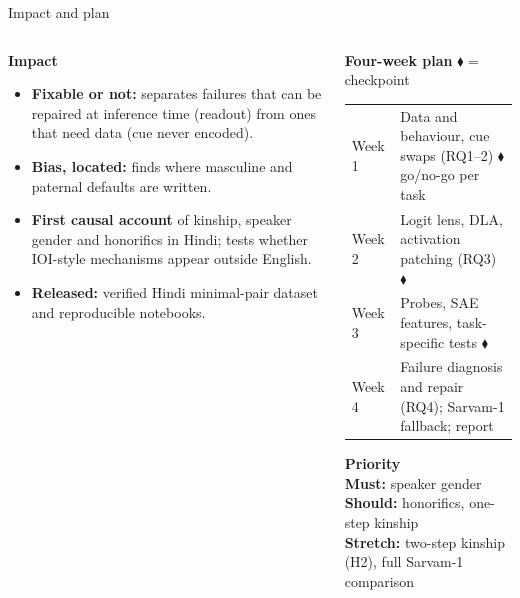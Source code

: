 \documentclass[aspectratio=169,10pt]{beamer}
\begin{document}
\begin{frame}{Impact and plan}
\begin{columns}[T]
\begin{column}{0.47\textwidth}
\small
\textbf{Impact}
\begin{itemize}
  \setlength\itemsep{0.3em}
  \item \textbf{Fixable or not:} separates failures that can be repaired at inference time (readout) from ones that need data (cue never encoded).
  \item \textbf{Bias, located:} finds where masculine and paternal defaults are written.
  \item \textbf{First causal account} of kinship, speaker gender and honorifics in Hindi; tests whether IOI-style mechanisms appear outside English.
  \item \textbf{Released:} verified Hindi minimal-pair dataset and reproducible notebooks.
\end{itemize}
\end{column}
\begin{column}{0.5\textwidth}
\footnotesize
\textbf{Four-week plan} \textcolor{accent}{\(\blacklozenge\)} = checkpoint
\vspace{0.2em}

\begin{tabularx}{\textwidth}{@{}l Y@{}}
\toprule
Week 1 & Data and behaviour, cue swaps (RQ1--2) \textcolor{accent}{\(\blacklozenge\)} go/no-go per task \\
Week 2 & Logit lens, DLA, activation patching (RQ3) \textcolor{accent}{\(\blacklozenge\)} \\
Week 3 & Probes, SAE features, task-specific tests \textcolor{accent}{\(\blacklozenge\)} \\
Week 4 & Failure diagnosis and repair (RQ4); Sarvam-1 fallback; report \\
\bottomrule
\end{tabularx}

\vspace{0.6em}
\textbf{Priority}\\
\textbf{Must:} speaker gender \quad \textbf{Should:} honorifics, one-step kinship\\
\textbf{Stretch:} two-step kinship (H2), full Sarvam-1 comparison
\end{column}
\end{columns}
\end{frame}
\end{document}
